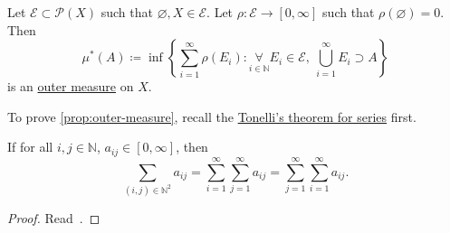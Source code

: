 \begin{proposition}\label{prop:outer-measure}
	Let \(\mathcal{E} \subset \mathcal{P} (X)\) such that \(\varnothing, X \in  \mathcal{E} \). Let \(\rho\colon \mathcal{E} \to [0, \infty ]\) such that \(\rho(\varnothing ) = 0\). Then
	\[
		\mu^{\ast} (A) \coloneqq \inf\left\{\sum_{i=1}^{\infty} \rho(E_{i})\colon \underset{i\in \mathbb{N} }{\forall}E_{i}\in \mathcal{E},\ \bigcup_{i=1}^{\infty} E_{i}\supset A\right\}
	\]
	is an \hyperref[def:outer-measure]{outer measure} on \(X\).
\end{proposition}

To prove \autoref{prop:outer-measure}, recall the \href{https://en.wikipedia.org/wiki/Fubini\%27s_theorem}{Tonelli's theorem for series} first.

\begin{theorem}\label{thm:Tonelli-for-series}
	If for all \(i, j\in \mathbb{N} \), \(a_{ij}\in [0, \infty ]\), then
	\[
		\sum_{(i, j)\in\mathbb{N} ^2}a_{ij} = \sum_{i=1}^{\infty} \sum_{j=1}^{\infty} a_{ij} = \sum_{j=1}^{\infty} \sum_{i=1}^{\infty} a_{ij}.
	\]
\end{theorem}
\begin{proof}
	Read~\cite[Theorem 0.0.2]{tao2013introduction}.
\end{proof}